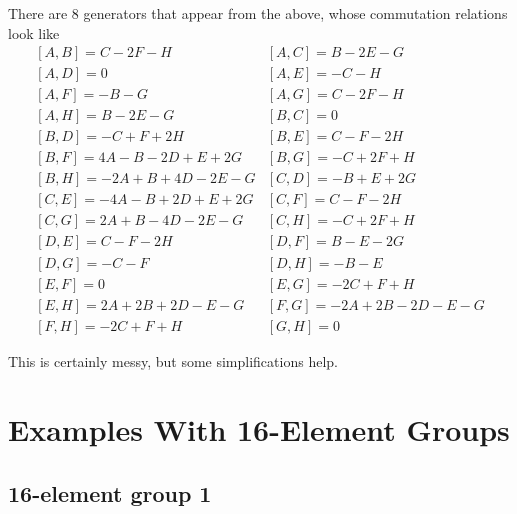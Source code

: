 \documentclass[12pt]{article}
\begin{document}
 There are 8 generators that appear from the above, whose commutation relations
look like
\begin{displaymath}
\begin{array}{cc}
\left[ A,B \right] = C - 2F -H &
\left[ A,C \right] = B - 2E -G \\
\left[ A,D \right] = 0 &
\left[ A,E \right] = -C -H \\
\left[ A,F \right] = -B -G &
\left[ A,G \right] = C -2F -H \\
\left[ A,H \right] = B -2E -G &
\left[ B,C \right] = 0 \\
\left[ B,D \right] = -C +F +2H &
\left[ B,E \right] = C-F-2H \\
\left[ B,F \right] = 4A-B-2D+E+2G &
\left[ B,G \right] = -C+2F+H \\
\left[ B,H \right] = -2A+B+4D-2E-G &
\left[ C,D \right] = -B+E+2G \\
\left[ C,E \right] = -4A-B+2D+E+2G &
\left[ C,F \right] = C-F-2H  \\
\left[ C,G \right] = 2A+B-4D-2E-G &
\left[ C,H \right] = -C+2F+H \\
\left[ D,E \right] = C-F-2H &
\left[ D,F \right] = B-E-2G \\
\left[ D,G \right] = -C-F &
\left[ D,H \right] = -B-E \\
\left[ E,F \right] = 0 &
\left[ E,G \right] = -2C+F+H  \\
\left[ E,H \right] = 2A+2B+2D-E-G &
\left[ F,G \right] = -2A+2B-2D-E-G \\
\left[ F,H \right] = -2C+F+H &
\left[ G,H \right] = 0
\end{array}
\end{displaymath}

	This is certainly messy, but some simplifications help.

\section{ Examples With 16-Element Groups}
\subsection{16-element group 1}
\end{document}
